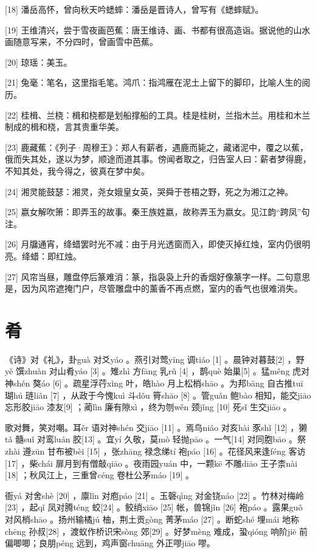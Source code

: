 \documentclass[12pt,UTF8]{ctexbook}
\begin{document}
[18] 潘岳高怀，曾向秋天吟蟋蟀：潘岳是晋诗人，曾写有《蟋蟀赋》。

[19] 王维清兴，尝于雪夜画芭蕉：唐王维诗、画、书都有很高造诣。据说他的山水画随意写来，不分四时，曾画雪中芭蕉。

[20] 琼瑶：美玉。

[21] 兔毫：笔名，这里指毛笔。鸿爪：指鸿雁在泥土上留下的脚印，比喻人生的阅历。

[22] 桂楫、兰桡：楫和桡都是划船撑船的工具。桂是桂树，兰指木兰。用桂和木兰制成的楫和桡，言其贵重华美。

[23] 鹿藏蕉：《列子·周穆王》：郑人有薪者，遇鹿而毙之，藏诸泥中，覆之以蕉，俄而失其处，遂以为梦，顺途而道其事。傍闻者取之，归告室人曰：薪者梦得鹿，不知其处，我今得之，彼真在梦中矣。

[24] 湘灵能鼓瑟：湘灵，尧女娥皇女英，哭舜于苍梧之野，死之为湘江之神。

[25] 嬴女解吹箫：即弄玉的故事。秦王族姓嬴，故称弄玉为嬴女。见江韵“跨凤”句注。

[26] 月牖通宵，绛蜡罢时光不减：由于月光透窗而入，即使灭掉红烛，室内仍很明亮。绛蜡：即红烛。

[27] 风帘当昼，雕盘停后篆难消：篆，指袅袅上升的香烟好像篆字一样。二句意思是，因为风帘遮掩门户，尽管雕盘中的薰香不再点燃，室内的香气也很难消失。





\chapter{肴}


《诗》对《礼》，卦guà 对爻yáo 。燕引对莺yīng 调tiáo [1] 。晨钟对暮鼓[2] ，野yě 馔zhuàn 对山肴yáo [3] 。雉zhì 方fāng 乳rǔ [4] ，鹊què 始巢[5] 。猛měng 虎对神shén 獒áo [6] 。疏星浮荇xìng 叶，皓hào 月上松梢shāo 。为邦bāng 自古推tuī 瑚hú 琏liǎn [7] ，从政于今愧kuì 斗dǒu 筲shāo [8] 。管guǎn 鲍bào 相知，能交jiāo 忘形胶jiāo 漆友[9] ；蔺lìn 廉有隙xì ，终为刎wěn 颈jǐng [10] 死sǐ 生交jiāo 。

歌对舞，笑对嘲。耳ěr 语对神shén 交jiāo [11] 。焉鸟niǎo 对亥hài 豕shǐ [12] ，獭tǎ 髓suǐ 对鸾luán 胶[13] 。宜yí 久敬，莫mò 轻抛pāo 。一气[14] 对同胞bāo 。祭zhài 遵zūn 甘布被bèi [15] ，张zhāng 禄念绨tí 袍páo [16] 。花径风来逢féng 客访[17] ，柴chái 扉月到有僧敲qiāo 。夜雨园yuán 中，一颗kē 不雕diāo 王子柰nài [18] ；秋风江上，三重曾céng 卷杜公茅máo [19] 。

衙yá 对舍shè [20] ，廪lǐn 对庖páo [21] 。玉磬qìng 对金铙náo [22] 。竹林对梅岭[23] ，起qǐ 凤对腾téng 蛟[24] 。鲛绡xiāo [25] 帐，兽锦jǐn [26] 袍páo 。露果guǒ 对风梢shāo 。扬州输橘jú 柚，荆土贡gòng 菁茅máo [27] 。断蛇shé 埋mái 地称chēng 孙叔[28] ，渡蚁作桥识宋sòng 郊[29] 。好梦mèng 难成，蛩qióng 响阶jiē 前偏唧唧；良朋péng 远到，鸡声窗chuāng 外正嘐jiāo 嘐。
\end{document}
